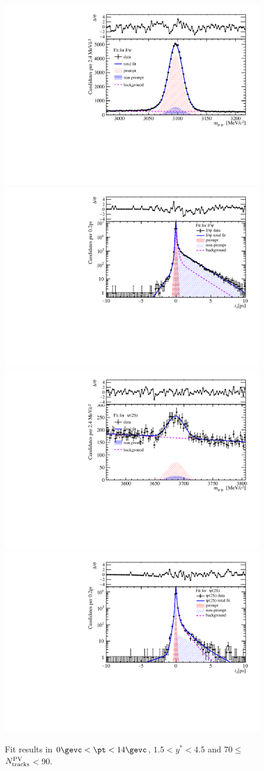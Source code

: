 \begin{figure}[H]
\begin{center}
\includegraphics[width=0.45\linewidth]{pdf/Pbp/Workdir/TwoDimFit/ProjMass/Jpsi_n3y1pt1.pdf}
\includegraphics[width=0.45\linewidth]{pdf/Pbp/Workdir/TwoDimFit/ProjTz/Jpsi_n3y1pt1.pdf}
\vspace*{-0.5cm}
\includegraphics[width=0.45\linewidth]{pdf/Pbp/Workdir/TwoDimFit/ProjMass/Psi2S_n3y1pt1.pdf}
\includegraphics[width=0.45\linewidth]{pdf/Pbp/Workdir/TwoDimFit/ProjTz/Psi2S_n3y1pt1.pdf}
\vspace*{-0.5cm}
\end{center}
\caption{Fit results in $0\gevc<\pt<14\gevc$, $1.5<y^*<4.5$ and 70$\leq$$N_{\rm tracks}^{\rm PV}$$<$90.}
\end{figure}
